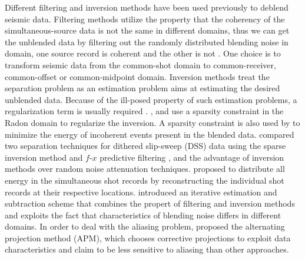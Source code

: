 
Different filtering and inversion methods have been used previously to deblend seismic data. Filtering methods utilize the property that the coherency of the simultaneous-source data is not the same in different domains, thus we can get the unblended data by filtering out the randomly distributed blending noise in  domain,  one source record is coherent and the other is not \cite[]{gary,araz2012,mediandeblend}. One choice is to transform seismic data from the common-shot domain to common-receiver, common-offset or common-midpoint domain. Inversion methods treat the separation problem as an estimation problem  aims at estimating the desired  unblended data. Because of the ill-posed property of such estimation problems, a regularization term is usually required \cite[]{pana2}. \cite{moore2008}, \cite{akerberg2008} and \cite{moore2010} use a sparsity constraint in the Radon domain to regularize the inversion. A sparsity constraint is also used by \cite{abma2010} to minimize the energy of  incoherent events present in the blended data. \cite{bagaini2012} compared two separation techniques for  dithered slip-sweep (DSS) data using the sparse inversion method \cite{moore2010} and  $f$-$x$ predictive filtering \cite[]{canales1984,yangkang2014}, and   the advantage of  inversion methods over  random noise attenuation techniques. \cite{borselen2012} proposed to distribute all energy in the simultaneous shot records by reconstructing the individual shot records at their respective locations. \cite{araz2012} introduced an iterative estimation and subtraction scheme that combines the propert of filtering and inversion methods and exploits the fact that characteristics of  blending noise differs in different domains. In order to deal with the aliasing problem, \cite{proj} proposed the alternating projection method (APM), which chooses corrective projections to exploit data characteristics and  claim to be less sensitive to aliasing than  other approaches. 

